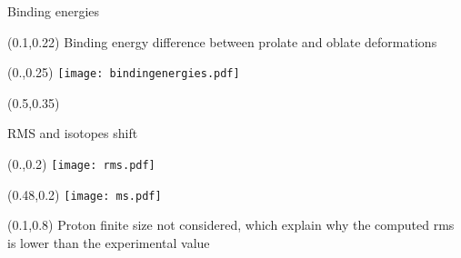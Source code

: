 \documentclass[10pt,aspectratio=169]{beamer}
\begin{document}
\begin{frame}{Binding energies}

    \centering 
    \begin{textblock*}{0.8\paperwidth}(0.1\paperwidth,0.22\paperheight)
        \centering
        Binding energy difference between prolate and oblate deformations
    \end{textblock*}
    \begin{textblock*}{0.5\paperwidth}(0.\paperwidth,0.25\paperheight)
        \centering
        \texttt{[image: bindingenergies.pdf]}
    \end{textblock*}
    \begin{textblock*}{0.45\paperwidth}(0.5\paperwidth,0.35\paperheight)
    \end{textblock*}
\end{frame}

\begin{frame}{RMS and isotopes shift}

    \centering 

    \begin{textblock*}{0.5\paperwidth}(0.\paperwidth,0.2\paperheight)
        \centering
        \texttt{[image: rms.pdf]}
    \end{textblock*}
    \begin{textblock*}{0.5\paperwidth}(0.48\paperwidth,0.2\paperheight)
        \centering
        \texttt{[image: ms.pdf]}
    \end{textblock*}
    \begin{textblock*}{0.8\paperwidth}(0.1\paperwidth,0.8\paperheight)
        Proton finite size not considered, which explain why the computed rms is lower than the experimental value
    \end{textblock*}
\end{frame}
\end{document}
